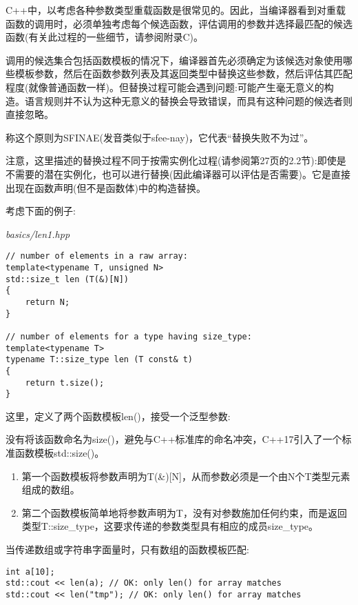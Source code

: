 
C++中，以考虑各种参数类型重载函数是很常见的。因此，当编译器看到对重载函数的调用时，必须单独考虑每个候选函数，评估调用的参数并选择最匹配的候选函数(有关此过程的一些细节，请参阅附录C)。

调用的候选集合包括函数模板的情况下，编译器首先必须确定为该候选对象使用哪些模板参数，然后在函数参数列表及其返回类型中替换这些参数，然后评估其匹配程度(就像普通函数一样)。但替换过程可能会遇到问题:可能产生毫无意义的构造。语言规则并不认为这种无意义的替换会导致错误，而具有这种问题的候选者则直接忽略。

称这个原则为SFINAE(发音类似于sfee-nay)，它代表“替换失败不为过”。

注意，这里描述的替换过程不同于按需实例化过程(请参阅第27页的2.2节):即使是不需要的潜在实例化，也可以进行替换(因此编译器可以评估是否需要)。它是直接出现在函数声明(但不是函数体)中的构造替换。

考虑下面的例子:

\noindent
\textit{basics/len1.hpp}
\begin{lstlisting}[style=styleCXX]
// number of elements in a raw array:
template<typename T, unsigned N>
std::size_t len (T(&)[N])
{
	return N;
}

// number of elements for a type having size_type:
template<typename T>
typename T::size_type len (T const& t)
{
	return t.size();
}
\end{lstlisting}

这里，定义了两个函数模板len()，接受一个泛型参数:

\begin{tcolorbox}[colback=webgreen!5!white,colframe=webgreen!75!black]
\hspace*{0.75cm}没有将该函数命名为size()，避免与C++标准库的命名冲突，C++17引入了一个标准函数模板std::size()。
\end{tcolorbox}

\begin{enumerate}
\item 
第一个函数模板将参数声明为T(\&)[N]，从而参数必须是一个由N个T类型元素组成的数组。

\item 
第二个函数模板简单地将参数声明为T，没有对参数施加任何约束，而是返回类型T::size\_type，这要求传递的参数类型具有相应的成员size\_type。
\end{enumerate}

当传递数组或字符串字面量时，只有数组的函数模板匹配:

\begin{lstlisting}[style=styleCXX]
int a[10];
std::cout << len(a); // OK: only len() for array matches
std::cout << len("tmp"); // OK: only len() for array matches
\end{lstlisting}

